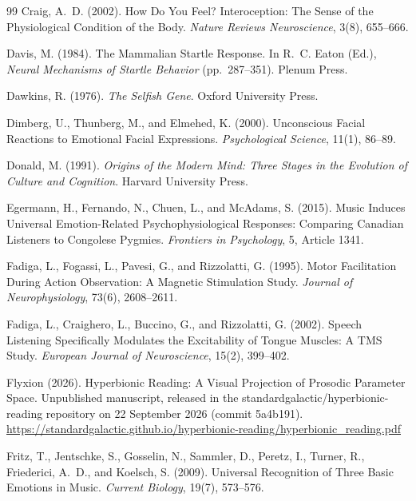 \documentclass[11pt]{article}
\theoremstyle{plain}
\theoremstyle{definition}
\begin{document}
\begin{thebibliography}{99}
Craig, A.~D. (2002).
How Do You Feel? Interoception: The Sense of the Physiological Condition of the Body.
\textit{Nature Reviews Neuroscience}, 3(8), 655--666.

Davis, M. (1984).
The Mammalian Startle Response.
In R.~C. Eaton (Ed.), \textit{Neural Mechanisms of Startle Behavior} (pp.\ 287--351).
Plenum Press.

Dawkins, R. (1976).
\textit{The Selfish Gene}.
Oxford University Press.

Dimberg, U., Thunberg, M., and Elmehed, K. (2000).
Unconscious Facial Reactions to Emotional Facial Expressions.
\textit{Psychological Science}, 11(1), 86--89.

Donald, M. (1991).
\textit{Origins of the Modern Mind: Three Stages in the Evolution of Culture and Cognition}.
Harvard University Press.

Egermann, H., Fernando, N., Chuen, L., and McAdams, S. (2015).
Music Induces Universal Emotion-Related Psychophysiological Responses: Comparing Canadian Listeners to Congolese Pygmies.
\textit{Frontiers in Psychology}, 5, Article 1341.

Fadiga, L., Fogassi, L., Pavesi, G., and Rizzolatti, G. (1995).
Motor Facilitation During Action Observation: A Magnetic Stimulation Study.
\textit{Journal of Neurophysiology}, 73(6), 2608--2611.

Fadiga, L., Craighero, L., Buccino, G., and Rizzolatti, G. (2002).
Speech Listening Specifically Modulates the Excitability of Tongue Muscles: A TMS Study.
\textit{European Journal of Neuroscience}, 15(2), 399--402.

Flyxion (2026).
Hyperbionic Reading: A Visual Projection of Prosodic Parameter Space.
Unpublished manuscript, released in the standardgalactic/hyperbionic-reading repository on 22 September 2026 (commit 5a4b191). \url{https://standardgalactic.github.io/hyperbionic-reading/hyperbionic_reading.pdf}

Fritz, T., Jentschke, S., Gosselin, N., Sammler, D., Peretz, I., Turner, R., Friederici, A.~D., and Koelsch, S. (2009).
Universal Recognition of Three Basic Emotions in Music.
\textit{Current Biology}, 19(7), 573--576.


\end{thebibliography}
\end{document}
